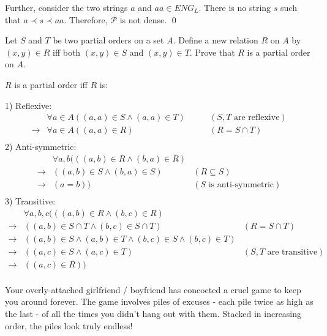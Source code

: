 \documentclass[addpoints]{exam}
\begin{document}
\begin{questions}
\begin{solution}
    Further, consider the two strings $a$ and $aa \in ENG_L$. There is no string $s$ such that $a \prec s \prec aa$. Therefore, $\mathcal{P}$ is not dense. \qed
     
  \end{solution}

\question
     Let $S$ and $T$ be two partial orders on a set $A$. Define a new relation $R$ on $A$ by $(x,y)\in R$ iff both $(x,y) \in S$ and $(x,y) \in T$. Prove that $R$ is a partial order on $A$.

    
      \begin{solution}
    $R$ is a partial order iff $R$ is:
    
    1) Reflexive: 
    \begin{align*}
    &\forall a \in A((a,a) \in S \wedge (a,a) \in T) \quad \quad &(S,T \text{ are reflexive})\\
    \rightarrow &\forall a \in A ((a,a) \in R) \quad \quad &(R = S \cap T)\\   
    \end{align*}
    2) Anti-symmetric:
	\begin{align*}
	&\forall a,b(((a,b) \in R \wedge (b,a) \in R)\\
	\rightarrow &((a,b) \in S \wedge (b,a) \in S) &(R \subseteq S)\\
	\rightarrow &(a = b)) &(S \text{ is anti-symmetric})\\
	\end{align*}
	3) Transitive:
	\begin{align*}
	&\forall a,b,c(((a,b) \in R \wedge (b,c) \in R)\\
	\rightarrow &((a,b) \in S \cap T \wedge (b,c) \in S \cap T) &(R = S \cap T)\\
	\rightarrow &((a,b) \in S \wedge (a,b) \in T \wedge (b,c) \in S \wedge (b,c) \in T)\\
	\rightarrow &((a,c) \in S \wedge (a,c) \in T) &(S,T \text{ are transitive})\\
	\rightarrow &((a,c) \in R)) \\
	\end{align*}
	
  \end{solution}

\question Your overly-attached girlfriend / boyfriend has concocted a cruel game to keep you around forever. The game involves piles of excuses - each pile twice as high as the last - of all the times you didn't hang out with them. Stacked in increasing order, the piles look truly endless! 


\end{questions}
\end{document}
